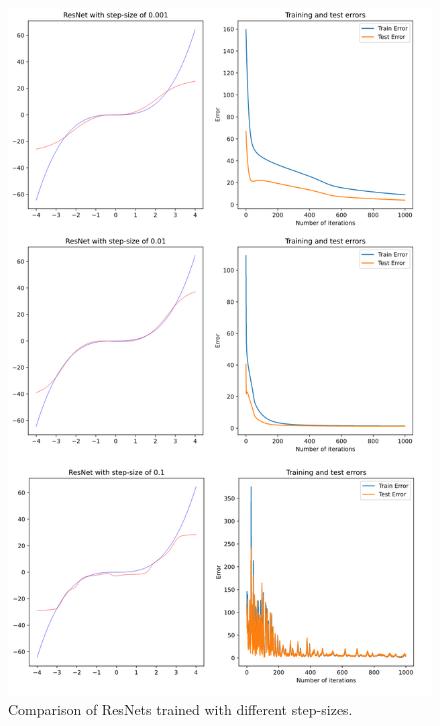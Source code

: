 \documentclass[10pt,a4paper]{article}
\theoremstyle{definition}
\theoremstyle{plain}
\begin{document}
\begin{figure}
\center
\includegraphics[scale=0.4]{resnet_ss.png}
\caption{Comparison of ResNets trained with different step-sizes.}
\label{res_ss}
\end{figure}
\end{document}
